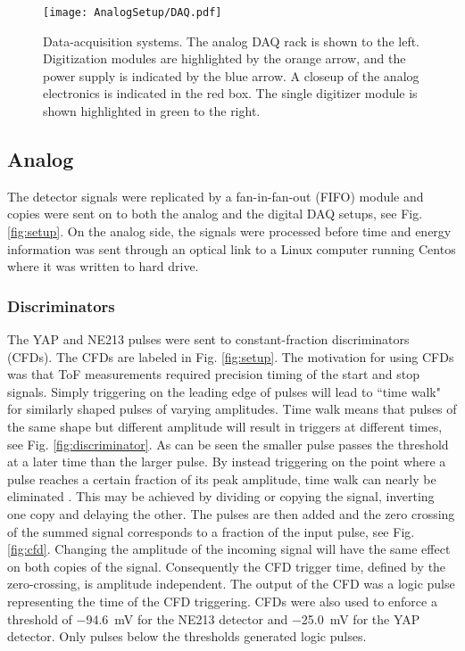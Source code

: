 \documentclass[main.tex]{subfiles}
\begin{document}
\begin{figure}[h]
    \centering
        \texttt{[image: AnalogSetup/DAQ.pdf]}
        \caption[Data-acquisition systems.]{Data-acquisition systems. The analog DAQ rack is shown to the left. Digitization modules are highlighted by the orange arrow, and the power supply is indicated by the blue arrow. A closeup of the analog electronics is indicated in the red box. The single digitizer module is shown highlighted in green to the right.}
    \label{fig:DAQ}
\end{figure}

\subsection{Analog}
The detector signals were replicated by a fan-in-fan-out (FIFO) module and copies were sent on to both the analog and the digital DAQ setups, see Fig. \ref{fig:setup}. On the analog side, the signals were processed before time and energy information was sent through an optical link to a Linux computer running Centos where it was written to hard drive. 

\subsubsection{Discriminators}
The YAP and NE213 pulses were sent to constant-fraction discriminators (CFDs). The CFDs are labeled  in Fig. \ref{fig:setup}. The motivation for using CFDs was that ToF measurements required precision timing of the start and stop signals. Simply triggering on the leading edge of pulses will lead to ``time walk" for similarly shaped pulses of varying amplitudes. Time walk means that pulses of the same shape but different amplitude will result in triggers at different times, see Fig. \ref{fig:discriminator}. As can be seen the smaller pulse passes the threshold at a later time than the larger pulse. By instead triggering on the point where a pulse reaches a certain fraction of its peak amplitude, time walk can nearly be eliminated \cite{Leo}. This may be achieved by dividing or copying the signal, inverting one copy and delaying the other. The pulses are then added and the zero crossing of the summed signal corresponds to a fraction of the input pulse, see Fig. \ref{fig:cfd}. Changing the amplitude of the incoming signal will have the same effect on both copies of the signal. Consequently the CFD trigger time, defined by the zero-crossing, is amplitude independent. The output of the CFD was a logic pulse representing the time of the CFD triggering. CFDs were also used to enforce a threshold of \SI{-94.6}{mV} for the NE213 detector and \SI{-25.0}{mV} for the YAP detector. Only pulses below the thresholds generated logic pulses.
\end{document}
